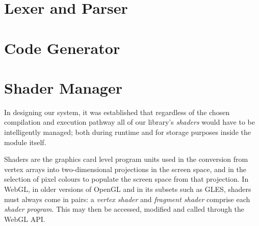 \documentclass{l3proj}
\begin{document}
\section{Lexer and Parser}
\label{arch-lex}

\section{Code Generator}
\label{arch-gen}

\section{Shader Manager}
\label{arch-shad}

In designing our system, it was established that regardless of the chosen compilation and execution pathway all of our library's \textit{shaders} would have to be intelligently managed; both during runtime and for storage purposes inside the module itself.

Shaders are the graphics card level program units used in the conversion from vertex arrays into two-dimensional projections in the screen space, and in the selection of pixel colours to populate the screen space from that projection. In WebGL, in older versions of OpenGL and in its subsets such as GLES, shaders must always come in pairs: a \textit{vertex shader} and \textit{fragment shader} comprise each \textit{shader program}. This may then be accessed, modified and called through the WebGL API.
\end{document}
